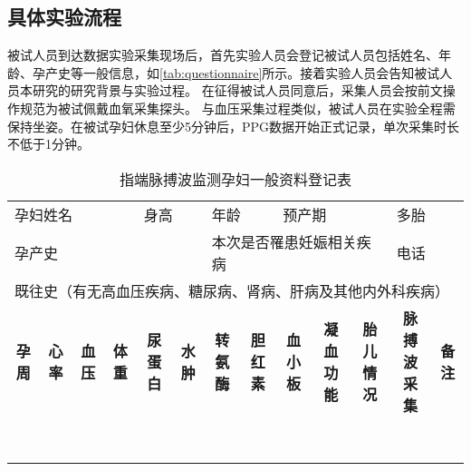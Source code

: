 \subsection{具体实验流程}
被试人员到达数据实验采集现场后，首先实验人员会登记被试人员包括姓名、年龄、孕产史等一般信息，如\autoref{tab:questionnaire}所示。接着实验人员会告知被试人员本研究的研究背景与实验过程。
在征得被试人员同意后，采集人员会按前文操作规范为被试佩戴血氧采集探头\cite{Chen2021}。
与血压采集过程类似\cite{FIGO}，被试人员在实验全程需保持坐姿。在被试孕妇休息至少5分钟后，PPG数据开始正式记录，单次采集时长不低于1分钟。
\begin{table}[htbp]
      \centering
      \fontsize{8}{4}
      \caption{指端脉搏波监测孕妇一般资料登记表}
      \label{tab:questionnaire}%
      \begin{tabularx}{\linewidth}{ccccccccccccc}
      \multicolumn{4}{l}{孕妇姓名} & \multicolumn{2}{l}{身高} & \multicolumn{2}{l}{年龄} & \multicolumn{3}{l}{预产期} & \multicolumn{2}{l}{多胎}\\
      \multicolumn{6}{l}{孕产史}   & \multicolumn{5}{l}{本次是否罹患妊娠相关疾病}  & \multicolumn{2}{l}{电话}  \\
      \multicolumn{13}{l}{既往史（有无高血压疾病、糖尿病、肾病、肝病及其他内外科疾病）}  \\
      \Xhline{1.2pt}
      \textbf{孕周} & \textbf{心率} & \textbf{血压} & \textbf{体重} & \textbf{尿蛋白} & \textbf{水肿} & \textbf{转氨酶} & \textbf{胆红素} & 
      \textbf{血小板} & \textbf{凝血功能} & \textbf{胎儿情况} & \textbf{脉搏波采集} & \textbf{备注} \\
      \hline

      &       &       &       &       &       &       &       &       &       &       &       &  \\

      &       &       &       &       &       &       &       &       &       &       &       &  \\
      
      &       &       &       &       &       &       &       &       &       &       &       &  \\

      &       &       &       &       &       &       &       &       &       &       &       &  \\

      &       &       &       &       &       &       &       &       &       &       &       &  \\

      &       &       &       &       &       &       &       &       &       &       &       &  \\

      &       &       &       &       &       &       &       &       &       &       &       &  \\
      \Xhline{1.2pt}
      \end{tabularx}%
\end{table}%
